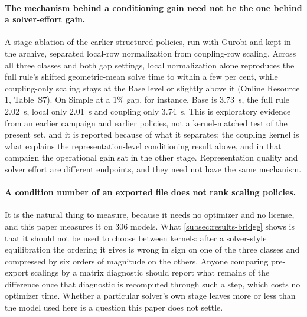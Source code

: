 \documentclass[smallextended,envcountsect,envcountsame]{svjour3}
\begin{document}
\paragraph{The mechanism behind a conditioning gain need not be the one behind a solver-effort
gain.} A stage ablation of the earlier structured policies, run with Gurobi and kept in the
archive, separated local-row normalization from coupling-row scaling. Across all three classes
and both gap settings, local normalization alone reproduces the full rule's shifted
geometric-mean solve time to within a few per cent, while coupling-only scaling stays at the
Base level or slightly above it (Online Resource 1, Table~S7). On Simple at a 1\% gap, for
instance, Base is 3.73~s, the full rule 2.02~s, local only 2.01~s and coupling only 3.74~s.
This is exploratory evidence from an earlier campaign and earlier policies, not a
kernel-matched test of the present set, and it is reported because of what it separates: the
coupling kernel is what explains the representation-level conditioning result above, and in
that campaign the operational gain sat in the other stage. Representation quality and solver
effort are different endpoints, and they need not have the same mechanism.

\paragraph{A condition number of an exported file does not rank scaling policies.} It is the
natural thing to measure, because it needs no optimizer and no license, and this paper measures
it on 306 models. What \cref{subsec:results-bridge} shows is that it should not be used to
choose between kernels: after a solver-style equilibration the ordering it gives is wrong in
sign on one of the three classes and compressed by six orders of magnitude on the others.
Anyone comparing pre-export scalings by a matrix diagnostic should report what remains of the
difference once that diagnostic is recomputed through such a step, which costs no optimizer
time. Whether a particular solver's own stage leaves more or less than the model used here is a
question this paper does not settle.
\end{document}
